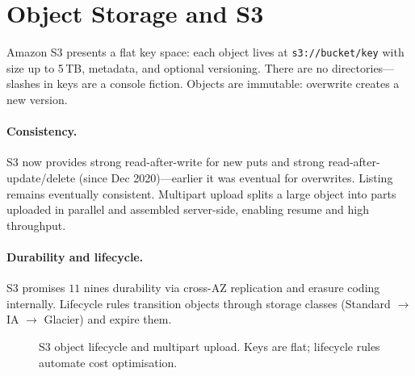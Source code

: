 \section{Object Storage and S3}
\label{sec:s3}
Amazon S3 presents a flat key space: each object lives at \texttt{s3://bucket/key} with size up to 5\,TB, metadata, and optional versioning. There are no directories---slashes in keys are a console fiction. Objects are immutable: overwrite creates a new version.

\paragraph{Consistency.} S3 now provides strong read-after-write for new puts and strong read-after-update/delete (since Dec 2020)---earlier it was eventual for overwrites. Listing remains eventually consistent. Multipart upload splits a large object into parts uploaded in parallel and assembled server-side, enabling resume and high throughput.

\paragraph{Durability and lifecycle.} S3 promises $11$ nines durability via cross-AZ replication and erasure coding internally. Lifecycle rules transition objects through storage classes (Standard $\to$ IA $\to$ Glacier) and expire them.

\begin{figure}[h]
\centering
{}
\caption{S3 object lifecycle and multipart upload. Keys are flat; lifecycle rules automate cost optimisation.}
\label{fig:s3}
\end{figure}

